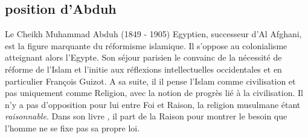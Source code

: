 \subsection{position d'Abduh} Le Cheikh {Muhammad Abduh} (1849 - 1905) Egyptien, successeur d'Al Afghani, est la figure marquante du réformisme islamique. Il s'oppose au colonialisme atteignant alors l'Egypte. Son séjour  parisien le convainc de la nécessité de réforme de l'Islam et l'initie aux réflexions intellectuelles occidentales et en particulier François Guizot. A sa suite, il il pense l'Islam comme civilisation et pas uniquement comme Religion, avec la notion de progrès lié à la civilisation. Il n'y a pas d'opposition pour lui entre Foi et Raison, la religion musulmane étant \textit{raisonnable}.    Dans son livre \citet{Abdou:Rissalat}, il part de la Raison pour montrer le besoin que l'homme ne se fixe pas sa propre loi.

